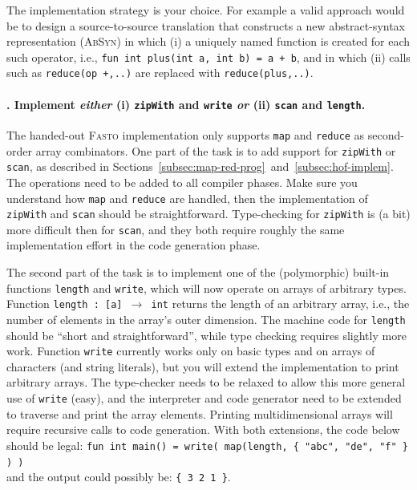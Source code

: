 \documentclass[a4paper,11pt]{article}
\newcommand{\fasto}{\textsc{Fasto}\xspace}
\begin{document}
The implementation strategy is your choice. For example a valid approach
would be to design a source-to-source translation that constructs a new 
abstract-syntax representation (\textsc{AbSyn})
in which (i) a uniquely named function is created for each such operator, i.e.,
{\tt fun int plus(int a, int b) = a + b}, and in which (ii) calls
such as {\tt reduce(op +,..)} are replaced with {\tt reduce(plus,..)}. 


\paragraph{\nexttask. Implement \emph{either} (i) \texttt{zipWith} and
\texttt{write} \emph{or} (ii) \texttt{scan} and \texttt{length}.}
The handed-out \fasto implementation only supports \texttt{map} and
\texttt{reduce} as second-order array combinators.  One part of the task is to
add support for \texttt{zipWith} or \texttt{scan}, as described in
Sections~\ref{subsec:map-red-prog}~and~\ref{subsec:hof-implem}.  The operations
need to be added to all compiler phases.
Make sure you understand how \texttt{map}
and \texttt{reduce} are handled, then the implementation of \texttt{zipWith}
and \texttt{scan} should be straightforward.  Type-checking for
\texttt{zipWith} is (a bit) more difficult then for \texttt{scan}, and they
both require roughly the same implementation effort in the code generation
phase. 

The second part of the task is to implement one of the (polymorphic) built-in
functions \texttt{length} and \texttt{write}, which will now operate on arrays
of arbitrary types.
%
Function \texttt{length : [a] $\rightarrow$ int} returns the length of an
arbitrary array, i.e., the number of elements in the array's outer dimension.
The machine code for \texttt{length} should be ``short and straightforward'',
while type checking requires slightly more work.
%
Function \texttt{write} currently works only on basic types and on arrays of
characters (and string literals), but you will extend the implementation to
print arbitrary arrays.  The type-checker needs to be relaxed to allow this
more general use of \texttt{write} (easy), and the interpreter and code
generator need to be extended to traverse and print the array elements.
Printing multidimensional arrays will require recursive calls to code
generation.
%
With both extensions, the code below should be legal: \texttt{fun int main() = write(
map(length, \{ "abc", "de", "f" \} ) )} \\ and the output could possibly be:
\texttt{\{ 3 2 1 \}}.
\end{document}

